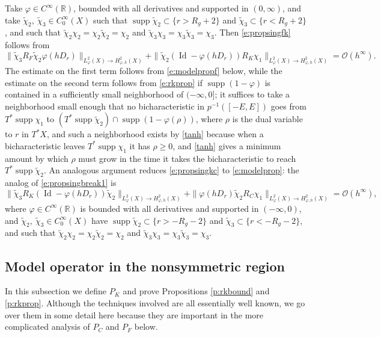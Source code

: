 \documentclass[reqno, 12pt]{amsart}
\newcommand \R {\mathbb{R}}
\newcommand \Oh {\mathcal{O}}
\DeclareMathOperator \supp {supp}
\DeclareMathOperator \Id {Id}
\theoremstyle{definition}
\numberwithin{equation}{section}
\numberwithin{prop}{section}
\numberwithin{figure}{section}
\begin{document}
Take $\varphi \in C^\infty(\R)$, bounded with all derivatives and supported in $(0,\infty)$, and take $\widetilde \chi_2, \ \widetilde \chi_3 \in C_0^\infty(X)$ such that $\supp \widetilde\chi_2 \subset \{r>R_g+2\}$ and $\widetilde\chi_3 \subset \{r < R_g+2\}$, and such that $\widetilde\chi_2 \chi_2 = \chi_2 \widetilde\chi_2 = \chi_2$ and $\widetilde\chi_3 \chi_3 = \chi_3 \widetilde\chi_3 = \chi_3$. 
Then \eqref{e:propsingfk} follows from
\begin{equation}\label{e:propsingbreak1}
\|\widetilde \chi_3 R_F \widetilde \chi_2 \varphi(h D_r) \| _{L^2_\varphi(X) \to H^2_{\varphi,h}(X)} + \|\widetilde \chi_2 (\Id - \varphi(hD_r)) R_K \chi_1\| _{L^2_\varphi(X) \to H^2_{\varphi,h}(X)}= \Oh(h^\infty).
\end{equation}
The estimate on the first term follows from \eqref{e:modelpropf} below, while the estimate on the second term follows from \eqref{e:rkprop} if $\supp(1-\varphi)$ is contained in a sufficiently small neighborhood of $(-\infty,0]$; it suffices to take a neighborhood small enough that no bicharacteristic in $p^{-1}([-E,E])$ goes from $T^*\supp \chi_1$ to $(T^*\supp \widetilde \chi_2) \cap \supp(1-\varphi(\rho))$, where $\rho$ is the dual variable to $r$ in $T^*X$, and such a neighborhood exists by \eqref{tanh} because when a bicharacteristic leaves $T^*\supp \chi_1$ it has $\rho \ge 0$, and \eqref{tanh} gives a minimum amount by which $\rho$ must grow in the time it takes the bicharacteristic to reach $T^*\supp \widetilde \chi_2$. An analogous argument reduces \eqref{e:propsingkc} to \eqref{e:modelprop}: the analog of \eqref{e:propsingbreak1} is
\[\|\widetilde \chi_3 R_K (\Id - \varphi(h D_r)) \widetilde \chi_2\| _{L^2_\varphi(X) \to H^2_{\varphi,h}(X)} + \| \varphi(hD_r) \widetilde \chi_2 R_C \chi_1\| _{L^2_\varphi(X) \to H^2_{\varphi,h}(X)}= \Oh(h^\infty),\]
where $\varphi \in C^\infty(\R)$ is bounded with all derivatives and supported in $(-\infty,0)$, and $\widetilde \chi_2, \ \widetilde \chi_3 \in C_0^\infty(X)$ have $\supp \widetilde\chi_2 \subset \{r>-R_g-2\}$ and $\widetilde\chi_3 \subset \{r < -R_g-2\}$, and such that $\widetilde\chi_2 \chi_2 = \chi_2 \widetilde\chi_2 = \chi_2$ and $\widetilde\chi_3 \chi_3 = \chi_3 \widetilde\chi_3 = \chi_3$.

\subsection{Model operator in the nonsymmetric region}\label{s:rk} In this subsection we define $P_K$ and prove Propositions \ref{p:rkbound} and \ref{p:rkprop}. Although the techniques involved are all essentially well known, we go over them in some detail here because they are important in the more complicated analysis of $P_C$ and $P_F$ below. 
\end{document}
